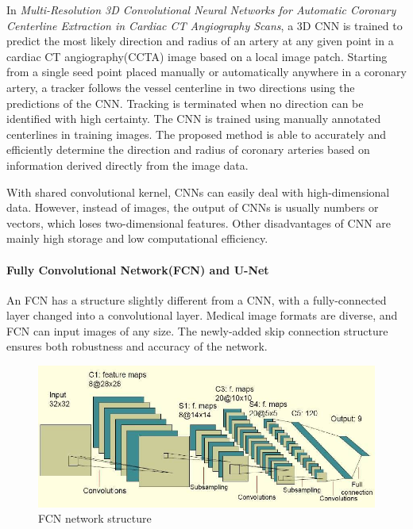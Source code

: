 \documentclass[lang=cn,11pt,a4paper,cite=numbers]{elegantpaper}
\begin{document}
In \emph{Multi-Resolution 3D Convolutional Neural Networks for Automatic Coronary Centerline Extraction in Cardiac CT Angiography Scans}\cite{10}, a 3D CNN is trained to predict the most likely direction and radius of an artery at any given point in a cardiac CT angiography(CCTA) image based on a local image patch. Starting from a single seed point placed manually or automatically anywhere in a coronary artery, a tracker follows the vessel centerline in two directions using the predictions of the CNN. Tracking is terminated when no direction can be identified with high certainty. The CNN is trained using manually annotated centerlines in training images. The proposed method is able to accurately and efficiently determine the direction and radius of coronary arteries based on information derived directly from the image data. 

With shared convolutional kernel, CNNs can easily deal with high-dimensional data. However, instead of images, the output of CNNs is usually numbers or vectors, which loses two-dimensional features. Other disadvantages of CNN are mainly high storage and low computational efficiency.

\paragraph{Fully Convolutional Network(FCN) and U-Net}

An FCN has a structure slightly different from a CNN, with a fully-connected layer changed into a convolutional layer. Medical image formats are diverse, and FCN can input images of any size. The newly-added skip connection structure ensures both robustness and accuracy of the network. 

\begin{figure}[H]
    \centering
    \includegraphics[scale=0.6]{./image/文献综述/FCN.jpg}
    \caption{FCN network structure}
    \label{fig:FCN}
\end{figure}
\end{document}
